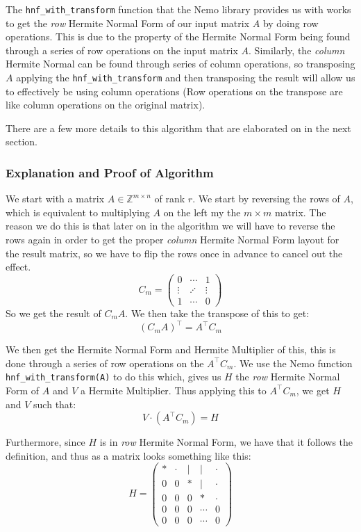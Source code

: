 \documentclass[oneside, a4paper, onecolumn, 11pt]{article}
\newcommand{\Zmn}[2]{\mathbb{Z}^{#1 \times #2}}
\begin{document}
The \texttt{hnf\_with\_transform} function that the Nemo library provides us with works to get the \textit{row} Hermite Normal Form of our input matrix \(A\) by doing row operations. This is due to the property of the Hermite Normal Form being found through a series of row operations on the input matrix \(A\). Similarly, the \textit{column} Hermite Normal can be found through series of column operations, so transposing \(A\) applying the \texttt{hnf\_with\_transform} and then transposing the result will allow us to effectively be using column operations (Row operations on the transpose are like column operations on the original matrix).

There are a few more details to this algorithm that are elaborated on in the next section.

\subsubsection{Explanation and Proof of Algorithm}

We start with a matrix \(A \in \Zmn{m}{n}\) of rank \(r\). We start by reversing the rows of \(A\), which is equivalent to multiplying \(A\) on the left my the \(m \times m\) matrix. The reason we do this is that later on in the algorithm we will have to reverse the rows again in order to get the proper \textit{column} Hermite Normal Form layout for the result matrix, so we have to flip the rows once in advance to cancel out the effect.
\[
    C_m = \begin{pmatrix}
        0      & \cdots  & 1      \\
        \vdots & \iddots & \vdots \\
        1      & \cdots  & 0
    \end{pmatrix}
\]
So we get the result of \(C_m A\). We then take the transpose of this to get:
\[
    (C_m A)^\intercal = A^\intercal C_m
\]

We then get the Hermite Normal Form and Hermite Multiplier of this, this is done through a series of row operations on the \(A^\intercal C_m\). We use the Nemo function \texttt{hnf\_with\_transform(A)} to do this which, gives us \(H\) the \textit{row} Hermite Normal Form of \(A\) and \(V\) a Hermite Multiplier. Thus applying this to \(A^\intercal C_m\), we get \(H\) and \(V\) such that:
\[
    V \cdot (A^\intercal C_m) = H
\]

Furthermore, since \(H\) is in \textit{row} Hermite Normal Form, we have that it follows the definition, and thus as a matrix looks something like this:
\[
    H = \left(
    \begin{array}{ccccc}
            * & \cdot & | & |      & \cdot \\
            0 & 0     & * & |      & \cdot \\
            0 & 0     & 0 & *      & \cdot \\
            0 & 0     & 0 & \cdots & 0     \\
            0 & 0     & 0 & \cdots & 0
        \end{array}
    \right)
\]
\end{document}
